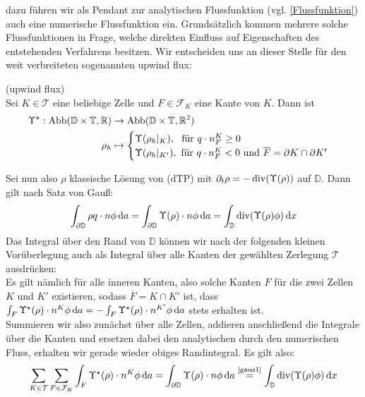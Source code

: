 dazu führen wir als Pendant zur analytischen Flussfunktion (vgl. \ref{Flussfunktion})
auch eine numerische Flussfunktion ein. Grundsätzlich kommen mehrere solche Flussfunktionen in Frage, welche direkten Einfluss auf Eigenschaften des entstehenden Verfahrens besitzen. Wir entscheiden uns an dieser Stelle für den weit verbreiteten 
sogenannten upwind flux:
\begin{Definition}(upwind flux)\\
	Sei $K \in \mathcal{T}$ eine beliebige Zelle und $ F \in \mathcal{F}_K$ eine Kante von $K$. Dann ist
	\begin{align*}
		\Upsilon^{\star} : \text{Abb}(\mathbb{D}\times\mathbb{T},\mathbb{R}) &\to \text{Abb}(\mathbb{D}\times\mathbb{T},\mathbb{R}^2) \\
		\rho_h &\mapsto 
		\begin{cases}
			\Upsilon(\rho_h|_K) , \ \text{ für } q\cdot n_F^K \geq 0 \\  
			\Upsilon(\rho_h|_{K'}) ,\text{ für } q\cdot n_F^K < 0 \text{ und } \overline{F} = \partial K \cap \partial K'
		\end{cases}
	\end{align*}
\end{Definition}
Sei nun also $ \rho $ klassische Lösung von (dTP) mit $ \partial_t \rho = -\operatorname{div}(\Upsilon(\rho)) $ auf $ \mathbb{D} $. Dann gilt nach Satz von Gauß:
\begin{align}
		\label{gaus1}
		\int_{\partial \mathbb{D}} \rho q \cdot n \phi \, \mathrm{d} a  =\int_{\partial \mathbb{D}} \Upsilon(\rho) \cdot n \phi \, \mathrm{d} a = \int_{\mathbb{D}} \operatorname{div} (\Upsilon(\rho)\phi) \, \mathrm{d} x
\end{align}
Das Integral über den Rand von $ \mathbb{D} $ können wir nach der folgenden kleinen Vorüberlegung auch als Integral über alle Kanten der gewählten Zerlegung $ \mathcal{T} $ ausdrücken: \\
Es gilt nämlich für alle inneren Kanten, also solche Kanten $ F $ für die zwei Zellen $ K $ und $ K' $ existieren, sodass $ \overline{F} = K \cap K' $ ist, dass $ \int_F \Upsilon^{\star}(\rho) \cdot n^K \phi \, \mathrm{d} a = - \int_F \Upsilon^{\star}(\rho) \cdot n^{K'} \phi \, \mathrm{d} a $ stets erhalten ist. \\
Summieren wir also zunächst über alle Zellen, addieren anschließend die Integrale über die Kanten und ersetzen dabei den analytischen durch den numerischen Fluss, erhalten wir gerade wieder obiges Randintegral. Es gilt also:
\begin{align*}
	\sum_{K\in \mathcal{T}} \sum_{F \in \mathcal{F}_K} \int_F \Upsilon^{\star}(\rho) \cdot n^K \phi \, \mathrm{d} a = \int_{\partial \mathbb{D}} \Upsilon(\rho) \cdot n \phi \, \mathrm{d} a \stackrel{\text{\ref{gaus1}}}{=} \int_{\mathbb{D}} \operatorname{div} (\Upsilon(\rho)\phi) \, \mathrm{d} x
\end{align*}
